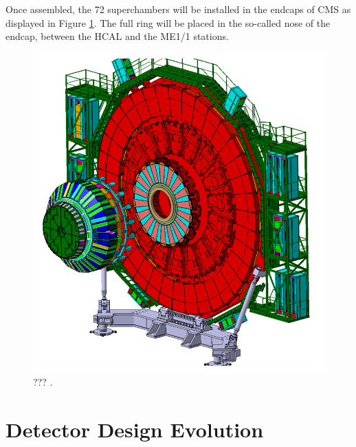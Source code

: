     Once assembled, the 72 superchambers will be installed in the endcaps of CMS as displayed in Figure \ref{fig:II-1-gem-wheel}. The full ring will be placed in the so-called nose of the endcap, between the HCAL and the ME1/1 stations.

    \begin{figure}[p]
      \centering
      \includegraphics[width=\textwidth]{img/II-1-gem/wheel.png}
      \caption{??? \cite{Colaleo:2021453}.}
      \label{fig:II-1-gem-wheel}
    \end{figure}

  \section{Detector Design Evolution}

